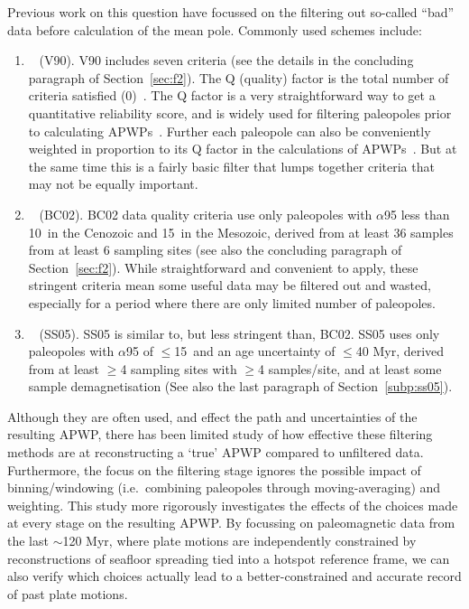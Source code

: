 Previous work on this question have focussed on the filtering out so-called
``bad'' data before calculation of the mean pole. Commonly used schemes include:
\begin{enumerate}
  \item~\citet{v90} (V90). V90 includes seven criteria (see the details in the
  concluding paragraph of Section~\ref{sec:f2}). The Q (quality) factor is the
  total number of criteria satisfied (0)~\citep{v88}. The Q factor
  is a very straightforward way to get a quantitative reliability score, and is
  widely used for filtering paleopoles prior to calculating
  APWPs~\citep[e.g.][]{T12,Ma16,F19}. Further each paleopole can also be
  conveniently weighted in proportion to its Q factor in the calculations of
  APWPs~\citep{T92}. But at the same time this is a fairly basic filter that
  lumps together criteria that may not be equally important.
  \item~\citet{B02} (BC02). BC02 data quality criteria use only paleopoles with
  $\alpha$95 less than 10\degree\ in the Cenozoic and 15\degree\ in the
  Mesozoic, derived from at least 36 samples from at least 6 sampling sites (see
  also the concluding paragraph of Section~\ref{sec:f2}). While straightforward and
  convenient to apply, these stringent criteria mean some useful data may be
  filtered out and wasted, especially for a period where there are only limited
  number of paleopoles.
  \item~\citet{S05} (SS05). SS05 is similar to, but less stringent than, BC02.
  SS05 uses only paleopoles with $\alpha$95 of $\leq$15\degree\ and an age
  uncertainty of $\leq$40 Myr, derived from at least $\geq$4 sampling sites with
  $\geq$4 samples/site, and at least some sample demagnetisation (See also the
  last paragraph of Section~\ref{subp:ss05}).
\end{enumerate}

Although they are often used, and effect the path and uncertainties of the
resulting APWP, there has been limited study of how effective these filtering
methods are at reconstructing a `true' APWP compared to unfiltered data.
Furthermore, the focus on the filtering stage ignores the possible impact of
binning/windowing (i.e.\ combining paleopoles through moving-averaging) and
weighting. This study more rigorously investigates the effects of the choices
made at every stage on the resulting APWP\@. By focussing on paleomagnetic data
from the last $\sim$120 Myr, where plate motions are independently constrained
by reconstructions of seafloor spreading tied into a hotspot reference frame, we
can also verify which choices actually lead to a better-constrained and accurate
record of past plate motions.


